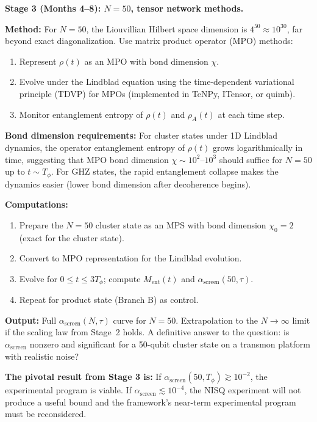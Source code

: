 \documentclass[12pt,letterpaper]{article}
\theoremstyle{plain}
\theoremstyle{definition}
\theoremstyle{remark}
\newcommand{\asc}{\alpha_{\mathrm{screen}}}
\begin{document}
\begin{opbox}
\textbf{Stage 3 (Months 4--8): $N = 50$, tensor network methods.}

\textbf{Method:} For $N = 50$, the Liouvillian Hilbert space dimension is $4^{50} \approx 10^{30}$, far beyond exact diagonalization. Use matrix product operator (MPO) methods:

\begin{enumerate}
\item Represent $\rho(t)$ as an MPO with bond dimension $\chi$.
\item Evolve under the Lindblad equation using the time-dependent variational principle (TDVP) for MPOs (implemented in TeNPy, ITensor, or quimb).
\item Monitor entanglement entropy of $\rho(t)$ and $\rho_A(t)$ at each time step.
\end{enumerate}

\textbf{Bond dimension requirements:} For cluster states under 1D Lindblad dynamics, the operator entanglement entropy of $\rho(t)$ grows logarithmically in time, suggesting that MPO bond dimension $\chi \sim 10^2$--$10^3$ should suffice for $N = 50$ up to $t \sim T_\phi$. For GHZ states, the rapid entanglement collapse makes the dynamics easier (lower bond dimension after decoherence begins).

\textbf{Computations:}
\begin{enumerate}
\item Prepare the $N = 50$ cluster state as an MPS with bond dimension $\chi_0 = 2$ (exact for the cluster state).
\item Convert to MPO representation for the Lindblad evolution.
\item Evolve for $0 \leq t \leq 3T_\phi$; compute $M_{\mathrm{ent}}(t)$ and $\asc(50,\tau)$.
\item Repeat for product state (Branch B) as control.
\end{enumerate}

\textbf{Output:} Full $\asc(N,\tau)$ curve for $N = 50$. Extrapolation to the $N\to\infty$ limit if the scaling law from Stage~2 holds. A definitive answer to the question: is $\asc$ nonzero and significant for a 50-qubit cluster state on a transmon platform with realistic noise?

\textbf{The pivotal result from Stage 3 is:} If $\asc(50, T_\phi) \gtrsim 10^{-2}$, the experimental program is viable. If $\asc \lesssim 10^{-4}$, the NISQ experiment will not produce a useful bound and the framework's near-term experimental program must be reconsidered.
\end{opbox}
\end{document}
